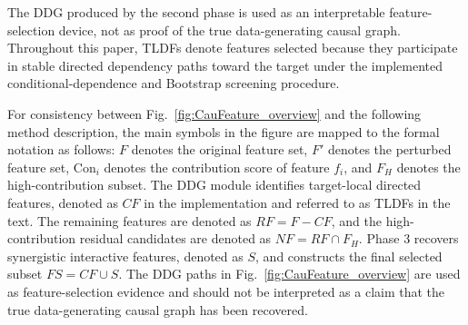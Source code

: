 \documentclass[journal]{IEEEtran}
\begin{document}
The DDG produced by the second phase is used as an interpretable feature-selection device, not as proof of the true data-generating causal graph. Throughout this paper, TLDFs denote features selected because they participate in stable directed dependency paths toward the target under the implemented conditional-dependence and Bootstrap screening procedure.

For consistency between Fig.~\ref{fig:CauFeature_overview} and the following method description, the main symbols in the figure are mapped to the formal notation as follows: $F$ denotes the original feature set, $F'$ denotes the perturbed feature set, $\text{Con}_i$ denotes the contribution score of feature $f_i$, and $F_H$ denotes the high-contribution subset. The DDG module identifies target-local directed features, denoted as $CF$ in the implementation and referred to as TLDFs in the text. The remaining features are denoted as $RF=F-CF$, and the high-contribution residual candidates are denoted as $NF=RF\cap F_H$. Phase 3 recovers synergistic interactive features, denoted as $S$, and constructs the final selected subset $FS=CF\cup S$. The DDG paths in Fig.~\ref{fig:CauFeature_overview} are used as feature-selection evidence and should not be interpreted as a claim that the true data-generating causal graph has been recovered.
\end{document}
